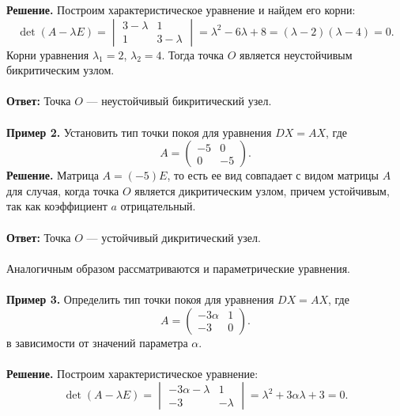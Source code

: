 \documentclass[a4paper, 12pt]{article}
\begin{document}
\textbf{Решение.} Построим характеристическое уравнение и найдем его корни:
$$\det (A - \lambda E) = \begin{vmatrix}
	3 - \lambda & 1\\
	1 & 3 - \lambda
\end{vmatrix} = \lambda^2 - 6\lambda + 8 = (\lambda - 2)(\lambda - 4) = 0.$$ Корни уравнения $\lambda_1 = 2$, $\lambda_2 = 4$. Тогда точка $O$ является неустойчивым бикритическим узлом.\\\\
\textbf{Ответ:} Точка $O$ --- неустойчивый бикритический узел.\\\\
\textbf{Пример 2.} Установить тип точки покоя для уравнения $DX = AX$, где $$A = \begin{pmatrix}
	-5 & 0\\
	0 & -5
\end{pmatrix}.$$
\textbf{Решение.} Матрица $A = (-5)E$, то есть ее вид совпадает с видом матрицы $A$ для случая, когда точка $O$ является дикритическим узлом, причем устойчивым, так как коэффициент $a$ отрицательный.\\\\ 
\textbf{Ответ:} Точка $O$ --- устойчивый дикритический узел.\\\\
Аналогичным образом рассматриваются и параметрические уравнения.\\\\
\textbf{Пример 3.} Определить тип точки покоя для уравнения $DX = AX$, где $$A = \begin{pmatrix}
	-3\alpha & 1\\
	-3 & 0
\end{pmatrix}.$$ в зависимости от значений параметра $\alpha$.\\\\
\textbf{Решение.} Построим характеристическое уравнение:
$$\det(A - \lambda E)  = \begin{vmatrix}
	-3\alpha - \lambda & 1\\
	-3 & -\lambda
\end{vmatrix} = \lambda^2 + 3\alpha\lambda + 3 = 0.$$
\end{document}

